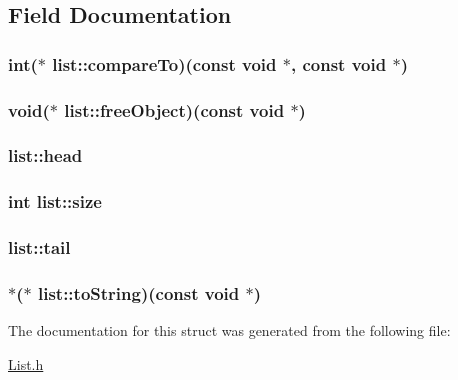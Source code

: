 \subsection{Field Documentation}
\hypertarget{structlist_ad3ad01e7ea22f2e0590e1d5549c8ab7f}{
\subsubsection[{compare\-To}]{\setlength{\rightskip}{0pt plus 5cm}int($\ast$ list\-::compare\-To)(const void $\ast$, const void $\ast$)}}\label{structlist_ad3ad01e7ea22f2e0590e1d5549c8ab7f}
\hypertarget{structlist_a04091cb910e425d1226562197fe0bf8c}{
\subsubsection[{free\-Object}]{\setlength{\rightskip}{0pt plus 5cm}void($\ast$ list\-::free\-Object)(const void $\ast$)}}\label{structlist_a04091cb910e425d1226562197fe0bf8c}
\hypertarget{structlist_a357a56cbe66297fb5cc5cd8ba9fa6cf4}{
\subsubsection[{head}]{ list\-::head}}\label{structlist_a357a56cbe66297fb5cc5cd8ba9fa6cf4}
\hypertarget{structlist_a3b03adad0c0429bae9493667ff366dc2}{
\subsubsection[{size}]{\setlength{\rightskip}{0pt plus 5cm}int list\-::size}}\label{structlist_a3b03adad0c0429bae9493667ff366dc2}
\hypertarget{structlist_a7fba27040dab68e2d6acc2885b6df167}{
\subsubsection[{tail}]{ list\-::tail}}\label{structlist_a7fba27040dab68e2d6acc2885b6df167}
\hypertarget{structlist_a3447393f975f748b5df5247155e9298a}{
\subsubsection[{to\-String}]{$\ast$($\ast$ list\-::to\-String)(const void $\ast$)}}\label{structlist_a3447393f975f748b5df5247155e9298a}


The documentation for this struct was generated from the following file\-:\begin{DoxyCompactItemize}
\item 
\hyperlink{List_8h}{List.\-h}\end{DoxyCompactItemize}
